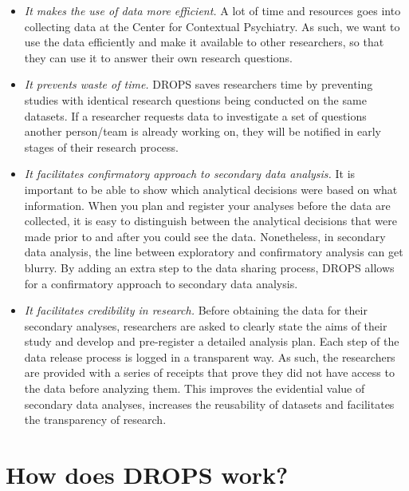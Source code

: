 \documentclass[
]{article}
\providecommand{\tightlist}{%
  \setlength{\itemsep}{0pt}\setlength{\parskip}{0pt}}
\begin{document}
\begin{itemize}
\tightlist
\item
  \emph{It makes the use of data more efficient.} A lot of time and
  resources goes into collecting data at the Center for Contextual
  Psychiatry. As such, we want to use the data efficiently and make it
  available to other researchers, so that they can use it to answer
  their own research questions.
\item
  \emph{It prevents waste of time.} DROPS saves researchers time by
  preventing studies with identical research questions being conducted
  on the same datasets. If a researcher requests data to investigate a
  set of questions another person/team is already working on, they will
  be notified in early stages of their research process.
\item
  \emph{It facilitates confirmatory approach to secondary data
  analysis.} It is important to be able to show which analytical
  decisions were based on what information. When you plan and register
  your analyses before the data are collected, it is easy to distinguish
  between the analytical decisions that were made prior to and after you
  could see the data. Nonetheless, in secondary data analysis, the line
  between exploratory and confirmatory analysis can get blurry. By
  adding an extra step to the data sharing process, DROPS allows for a
  confirmatory approach to secondary data analysis.
\item
  \emph{It facilitates credibility in research.} Before obtaining the
  data for their secondary analyses, researchers are asked to clearly
  state the aims of their study and develop and pre-register a detailed
  analysis plan. Each step of the data release process is logged in a
  transparent way. As such, the researchers are provided with a series
  of receipts that prove they did not have access to the data before
  analyzing them. This improves the evidential value of secondary data
  analyses, increases the reusability of datasets and facilitates the
  transparency of research.
\end{itemize}

\hypertarget{section}{%
\section{}\label{section}}

\hypertarget{how-does-drops-work}{%
\section{How does DROPS work?}\label{how-does-drops-work}}
\end{document}
